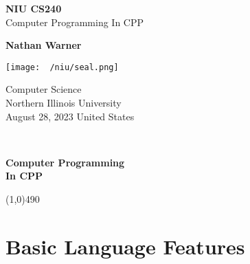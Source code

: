\documentclass{report}
\title{\Huge{}}
\author{\huge{Nathan Warner}}
\date{\huge{}}
\begin{document}
        \begin{titlepage}
       \begin{center}
           \vspace*{1cm}
    
           \textbf{NIU CS240} \\
           Computer Programming In CPP
    
           \vspace{0.5cm}
            
                
           \vspace{1.5cm}
             
           \textbf{Nathan Warner}
    
           \vfill
                
                
           \vspace{0.8cm}
         
           \texttt{[image: ~/niu/seal.png]}
                
           Computer Science \\
           Northern Illinois University\\
           August 28, 2023
           United States\\
           
                
       \end{center}
    \end{titlepage}
    \tableofcontent 
    \pagebreak \bigbreak \noindent 
    \vspace{2in} \\
    \begin{Huge}
       \textbf{Computer Programming \\
       In CPP} 
    \end{Huge}
    \bigbreak \noindent 
    \line(1,0){490}
    
    \bigbreak \noindent \bigbreak \noindent 
    \section{Basic Language Features}
    \bigbreak \noindent 
\end{document}
